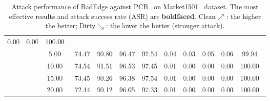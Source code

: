 \begin{table}[htbp]
{\begin{tabular}{cc|c|ccccccccc}
  \multicolumn{1}{c|}{0.00} &
  \multicolumn{1}{c|}{0.00} &
  100.00\ \\ \cline{3-12} 
\multicolumn{1}{c|}{} &
   &
  5.00\ &
  \multicolumn{1}{c|}{74.47} &
  \multicolumn{1}{c|}{90.80} &
  \multicolumn{1}{c|}{96.47} &
  \multicolumn{1}{c|}{97.54} &
  \multicolumn{1}{c|}{0.04} &
  \multicolumn{1}{c|}{0.03} &
  \multicolumn{1}{c|}{0.05} &
  \multicolumn{1}{c|}{0.06} &
  99.94\ \\ \cline{3-12} 
\multicolumn{1}{c|}{} &
   &
  10.00\ &
  \multicolumn{1}{c|}{74.54} &
  \multicolumn{1}{c|}{91.51} &
  \multicolumn{1}{c|}{96.53} &
  \multicolumn{1}{c|}{97.45} &
  \multicolumn{1}{c|}{0.01} &
  \multicolumn{1}{c|}{0.00} &
  \multicolumn{1}{c|}{0.00} &
  \multicolumn{1}{c|}{0.00} &
  100.00\ \\ \cline{3-12} 
\multicolumn{1}{c|}{} &
   &
  15.00\ &
  \multicolumn{1}{c|}{73.45} &
  \multicolumn{1}{c|}{90.26} &
  \multicolumn{1}{c|}{96.38} &
  \multicolumn{1}{c|}{97.54} &
  \multicolumn{1}{c|}{0.01} &
  \multicolumn{1}{c|}{0.00} &
  \multicolumn{1}{c|}{0.00} &
  \multicolumn{1}{c|}{0.00} &
  100.00\ \\ \cline{3-12} 
\multicolumn{1}{c|}{} &
   &
  20.00\ &
  \multicolumn{1}{c|}{72.44} &
  \multicolumn{1}{c|}{90.12} &
  \multicolumn{1}{c|}{96.05} &
  \multicolumn{1}{c|}{97.33} &
  \multicolumn{1}{c|}{0.01} &
  \multicolumn{1}{c|}{0.00} &
  \multicolumn{1}{c|}{0.00} &
  \multicolumn{1}{c|}{0.00} &
  100.00\ \\ \hline
\end{tabular}
}
\caption{
Attack performance of BadEdge against PCB~\cite{sun2018beyond} on Market1501~\cite{zhang2017alignedreid}  dataset. The most effective results and attack success rate (ASR) are \textbf{boldfaced}. Clean$\nearrow$: the higher the better; Dirty$\searrow$: the lower the better (stronger attack).}
%
\label{tab:PCB_mar}
 \vspace{-0.6cm}
\end{table}